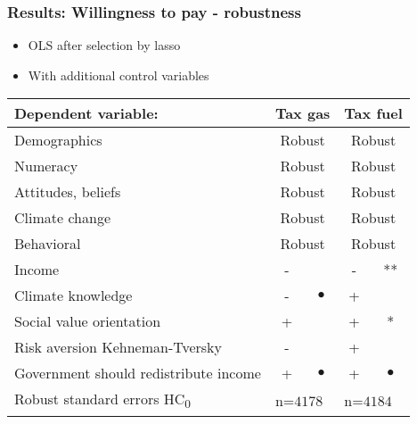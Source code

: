 \documentclass{beamer}              %
\begin{document}
\begin{frame}
\frametitle{Results: Willingness to pay - robustness}\label{ResultsLassoGas} 

\begin{itemize}
\item OLS after selection by lasso
\item With additional control variables
\end{itemize}

\begin{table}
\label{LassoBigSample} 
\begin{small}
\begin{tabular}{l|cc|cc} 
\hline
\rowcolor{PaleGreen} Dependent variable: &  \multicolumn{2}{c|}{\textbf{Tax gas}} &\multicolumn{2}{c}{\textbf{Tax fuel}} \\
\hline
Demographics & \multicolumn{2}{c|}{Robust}& \multicolumn{2}{c}{Robust} \\ 
Numeracy & \multicolumn{2}{c|}{Robust}& \multicolumn{2}{c}{Robust}  \\ 
Attitudes, beliefs & \multicolumn{2}{c|}{Robust}& \multicolumn{2}{c}{Robust}  \\ 
Climate change & \multicolumn{2}{c|}{Robust}& \multicolumn{2}{c}{Robust}  \\ 
Behavioral & \multicolumn{2}{c|}{Robust}& \multicolumn{2}{c}{Robust}  \\ 
\hline

  Income & -& & - &**\\
    Climate knowledge &- & $\bullet$ & +\\
Social value orientation & + & &+&*\\

 Risk aversion Kehneman-Tversky & - & & + & \\
  Government should redistribute income & + &$\bullet$ &+& $\bullet$\\
\hline
 \multicolumn{1}{l|}{Robust standard errors HC\textsubscript{0}}&  \multicolumn{2}{l|}{n=$4178$}&  \multicolumn{2}{l}{n=$4184$}\\
\end{tabular} 
\end{small}
\end{table} 

\end{frame}



\end{document}
